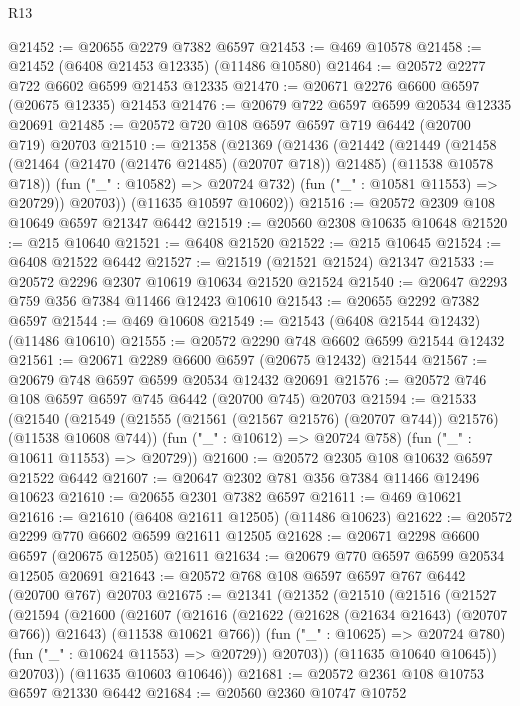 \begin{lexlean}{R13}
\begin{coremodule}
@21452 := @20655 @2279 @7382 @6597
@21453 := @469 @10578
@21458 := @21452 (@6408 @21453 @12335) (@11486 @10580)
@21464 := @20572 @2277 @722 @6602 @6599 @21453 @12335
@21470 := @20671 @2276 @6600 @6597 (@20675 @12335) @21453
@21476 := @20679 @722 @6597 @6599 @20534 @12335 @20691
@21485 := @20572 @720 @108 @6597 @6597 @719 @6442 (@20700 @719) @20703
@21510 := @21358
    (@21369
      (@21436
        (@21442
          (@21449
            (@21458 (@21464 (@21470 (@21476 @21485) (@20707 @718)) @21485) (@11538 @10578 @718))
            (fun ("_" : @10582) => @20724 @732)
            (fun ("_" : @10581 @11553) => @20729))
          @20703))
      (@11635 @10597 @10602))
@21516 := @20572 @2309 @108 @10649 @6597 @21347 @6442
@21519 := @20560 @2308 @10635 @10648
@21520 := @215 @10640
@21521 := @6408 @21520
@21522 := @215 @10645
@21524 := @6408 @21522 @6442
@21527 := @21519 (@21521 @21524) @21347
@21533 := @20572 @2296 @2307 @10619 @10634 @21520 @21524
@21540 := @20647 @2293 @759 @356 @7384 @11466 @12423 @10610
@21543 := @20655 @2292 @7382 @6597
@21544 := @469 @10608
@21549 := @21543 (@6408 @21544 @12432) (@11486 @10610)
@21555 := @20572 @2290 @748 @6602 @6599 @21544 @12432
@21561 := @20671 @2289 @6600 @6597 (@20675 @12432) @21544
@21567 := @20679 @748 @6597 @6599 @20534 @12432 @20691
@21576 := @20572 @746 @108 @6597 @6597 @745 @6442 (@20700 @745) @20703
@21594 := @21533
    (@21540
      (@21549 (@21555 (@21561 (@21567 @21576) (@20707 @744)) @21576) (@11538 @10608 @744))
      (fun ("_" : @10612) => @20724 @758)
      (fun ("_" : @10611 @11553) => @20729))
@21600 := @20572 @2305 @108 @10632 @6597 @21522 @6442
@21607 := @20647 @2302 @781 @356 @7384 @11466 @12496 @10623
@21610 := @20655 @2301 @7382 @6597
@21611 := @469 @10621
@21616 := @21610 (@6408 @21611 @12505) (@11486 @10623)
@21622 := @20572 @2299 @770 @6602 @6599 @21611 @12505
@21628 := @20671 @2298 @6600 @6597 (@20675 @12505) @21611
@21634 := @20679 @770 @6597 @6599 @20534 @12505 @20691
@21643 := @20572 @768 @108 @6597 @6597 @767 @6442 (@20700 @767) @20703
@21675 := @21341
    (@21352
      (@21510
        (@21516
          (@21527
            (@21594
              (@21600
                (@21607
                  (@21616
                    (@21622 (@21628 (@21634 @21643) (@20707 @766)) @21643)
                    (@11538 @10621 @766))
                  (fun ("_" : @10625) => @20724 @780)
                  (fun ("_" : @10624 @11553) => @20729))
                @20703))
            (@11635 @10640 @10645))
          @20703))
      (@11635 @10603 @10646))
@21681 := @20572 @2361 @108 @10753 @6597 @21330 @6442
@21684 := @20560 @2360 @10747 @10752

\end{coremodule}
\end{lexlean}
